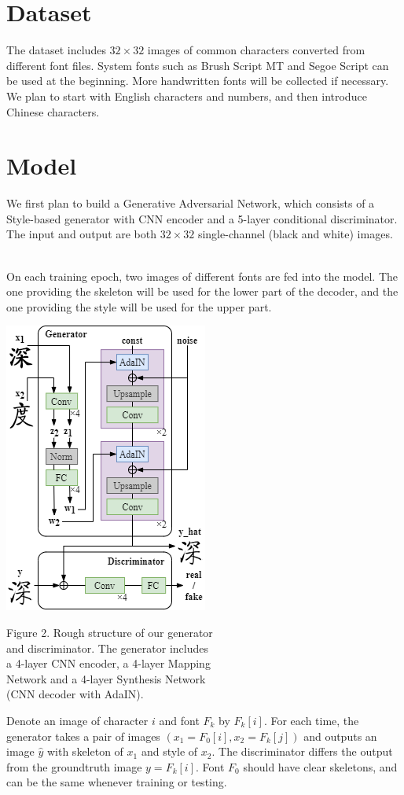 \documentclass[letterpaper]{article}
\begin{document}
\section{Dataset}
The dataset includes $32 \times 32$ images of common characters converted from different font files. System fonts such as Brush Script MT and Segoe Script can be used at the beginning. More handwritten fonts will be collected if necessary. We plan to start with English characters and numbers, and then introduce Chinese characters.

\section{Model}
We first plan to build a Generative Adversarial Network, which consists of a Style-based generator with CNN encoder and a 5-layer conditional discriminator. The input and output are both $32 \times 32$ single-channel (black and white) images.

\\
On each training epoch, two images of different fonts are fed into the model. The one providing the skeleton will be used for the lower part of the decoder, and the one providing the style will be used for the upper part.
\begin{center}
    \includegraphics[]{plan-fig-model.png}

    Figure 2. Rough structure of our generator\\and discriminator. The generator includes\\a 4-layer CNN encoder, a 4-layer Mapping\\Network and a 4-layer Synthesis Network\\(CNN decoder with AdaIN).
\end{center}
Denote an image of character $i$ and font $F_k$ by $F_k[i]$. For each time, the generator takes a pair of images $(x_1=F_0[i], x_2=F_k[j])$ and outputs an image $\hat{y}$ with skeleton of $x_1$ and style of $x_2$. The discriminator differs the output from the groundtruth image $y=F_k[i]$. Font $F_0$ should have clear skeletons, and can be the same whenever training or testing.
\end{document}
